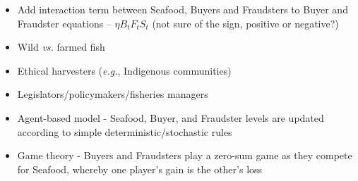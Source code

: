 \documentclass[12pt]{article}
\begin{document}
\begin{itemize}

\item Add interaction term between Seafood, Buyers and Fraudsters to Buyer and Fraudster equations -- $\eta B_tF_tS_t$ (not sure of the sign, positive or negative?)

\vspace{1mm}

\item Wild \textit{vs.} farmed fish

\vspace{1mm}

\item Ethical harvesters (\textit{e.g.}, Indigenous communities)

\vspace{1mm}

\item Legislators/policymakers/fisheries managers

\vspace{1mm}

\item Agent-based model - Seafood, Buyer, and Fraudster levels are updated according to simple deterministic/stochastic rules

\vspace{1mm}

\item Game theory - Buyers and Fraudsters play a zero-sum game as they compete for Seafood, whereby one player's gain is the other's loss

\end{itemize}

\newpage



\end{document}
